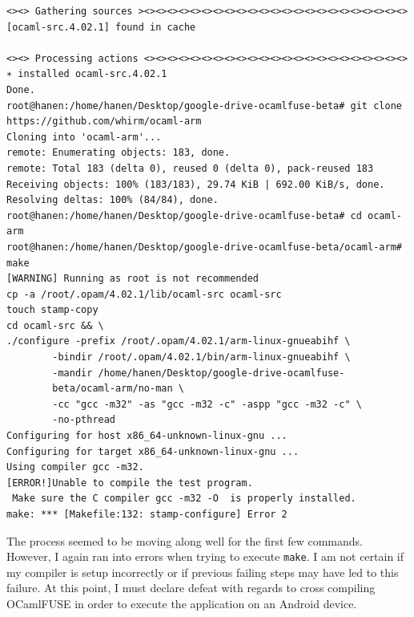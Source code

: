 \begin{verbatim}
<><> Gathering sources ><><><><><><><><><><><><><><><><><><><><><><><>
[ocaml-src.4.02.1] found in cache

<><> Processing actions <><><><><><><><><><><><><><><><><><><><><><><>
∗ installed ocaml-src.4.02.1
Done.
root@hanen:/home/hanen/Desktop/google-drive-ocamlfuse-beta# git clone 
https://github.com/whirm/ocaml-arm
Cloning into 'ocaml-arm'...
remote: Enumerating objects: 183, done.
remote: Total 183 (delta 0), reused 0 (delta 0), pack-reused 183
Receiving objects: 100% (183/183), 29.74 KiB | 692.00 KiB/s, done.
Resolving deltas: 100% (84/84), done.
root@hanen:/home/hanen/Desktop/google-drive-ocamlfuse-beta# cd ocaml-arm
root@hanen:/home/hanen/Desktop/google-drive-ocamlfuse-beta/ocaml-arm# make
[WARNING] Running as root is not recommended
cp -a /root/.opam/4.02.1/lib/ocaml-src ocaml-src
touch stamp-copy
cd ocaml-src && \
./configure -prefix /root/.opam/4.02.1/arm-linux-gnueabihf \
        -bindir /root/.opam/4.02.1/bin/arm-linux-gnueabihf \
        -mandir /home/hanen/Desktop/google-drive-ocamlfuse-
        beta/ocaml-arm/no-man \
        -cc "gcc -m32" -as "gcc -m32 -c" -aspp "gcc -m32 -c" \
        -no-pthread
Configuring for host x86_64-unknown-linux-gnu ...
Configuring for target x86_64-unknown-linux-gnu ...
Using compiler gcc -m32.
[ERROR!]Unable to compile the test program.
 Make sure the C compiler gcc -m32 -O  is properly installed.
make: *** [Makefile:132: stamp-configure] Error 2
\end{verbatim}
The process seemed to be moving along well for the first few commands. However, I again ran into errors when trying to execute \verb|make|. I am not certain if my compiler is setup incorrectly or if previous failing steps may have led to this failure. At this point, I must declare defeat with regards to cross compiling OCamlFUSE in order to execute the application on an Android device. 